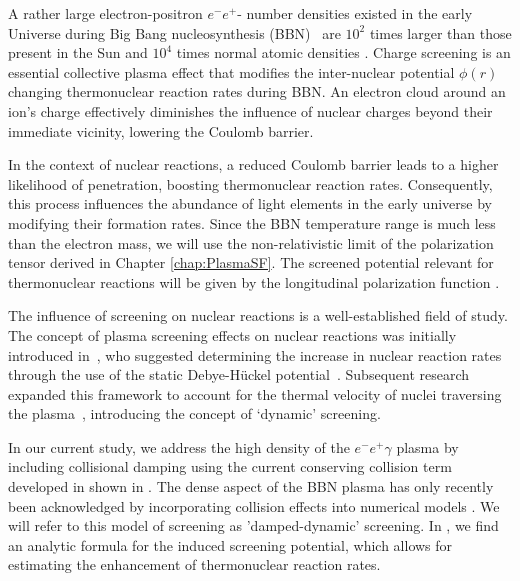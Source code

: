 A rather large electron-positron $e^-e^+$- number densities existed in the early Universe during Big Bang nucleosynthesis (BBN)~\cite{Wang:2010px,Hwang:2021kno,Rafelski:2023emw} are $10^2$ times larger than those present in the Sun \cite{Bahcall:2001smc} and $10^4$ times normal atomic densities \cite{Grayson:2023flr}. Charge screening is an essential collective plasma effect that modifies the inter-nuclear potential $\phi(r)$ changing thermonuclear reaction rates during BBN. An electron cloud around an ion's charge effectively diminishes the influence of nuclear charges beyond their immediate vicinity, lowering the Coulomb barrier. 

In the context of nuclear reactions, a reduced Coulomb barrier leads to a higher likelihood of penetration, boosting thermonuclear reaction rates. Consequently, this process influences the abundance of light elements in the early universe by modifying their formation rates. Since the BBN temperature range is much less than the electron mass, we will use the non-relativistic limit of the polarization tensor derived in Chapter \ref{chap:PlasmaSF}. The screened potential relevant for thermonuclear reactions will be given by the longitudinal polarization function .

The influence of screening on nuclear reactions is a well-established field of study. The concept of plasma screening effects on nuclear reactions was initially introduced in~\cite{Salpeter:1954nc}, who suggested determining the increase in nuclear reaction rates through the use of the static Debye-Hückel potential~\cite{Debye:1923,Salpeter:1969apj,Famiano:2016hhs}. Subsequent research expanded this framework to account for the thermal velocity of nuclei traversing the plasma~\cite{Hwang:2021kno,Carraro:1988apj,Gruzinov:1997as,Opher:1999jh,Yao:2016cjs}, introducing the concept of `dynamic' screening. 

In our current study, we address the high density of the $e^-e^+\gamma$ plasma by including collisional damping using the current conserving collision term developed in \cite{Formanek:2021blc} shown in . The dense aspect of the BBN plasma has only recently been acknowledged by incorporating collision effects into numerical models \cite{Sasankan:2019oee,Kedia:2020xdc}. We will refer to this model of screening as 'damped-dynamic' screening. In \cite{Grayson:2023flr}, we find an analytic formula for the induced screening potential, which allows for estimating the enhancement of thermonuclear reaction rates.

